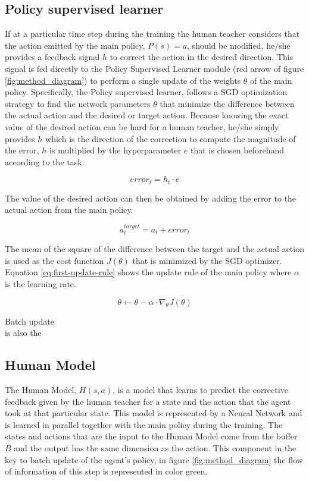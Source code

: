 \subsection*{Policy supervised learner}
If at a particular time step during the training the human teacher considers that the action emitted by the main policy, $P(s) = a$, should be modified, he/she provides a feedback signal $h$ to correct the action in the desired direction. This signal is fed directly to the Policy Supervised Learner module (red arrow of figure \ref{fig:method_diagram}) to perform a single update of the weights $\theta$ of the main policy. Specifically, the Policy supervised learner, follows a SGD optimization strategy to find the network parameters $\theta$ that minimize the difference between the actual action and the desired or target action. Because knowing the exact value of the desired action can be hard for a human teacher, he/she simply provides $h$ which is the direction of the correction to compute the magnitude of the error, $h$ is multiplied by the hyperparameter $e$ that is chosen beforehand according to the task.


\begin{equation}
{error}_t = h_t \cdot  e
\label{eq:error-D-COACH}
\end{equation}

The value of the desired action can then be obtained by adding the error to the actual action from the main policy.

\begin{equation}
a^{target}_t = a_t + {error}_t
\label{eq:a-target}
\end{equation}


The mean of the square of the difference between the target and the actual action is used as the cost function $J(\theta)$ that is minimized by the SGD optimizer. Equation \ref{eq:first-update-rule} shows the update rule of the main policy where $\alpha$ is the learning rate.


\begin{equation}
\theta \leftarrow \theta - \alpha \cdot \nabla_\theta J(\theta)
\label{eq:first-update-rule}
\end{equation}

Batch  update\\ is also the 




\subsection*{Human Model}
The Human Model,  $H(s, a)$, is a model that learns to predict the corrective feedback given by the human teacher for a state and the action that the agent took at that particular state. This model is represented by a Neural Network and is learned in parallel together with the main policy during the training. The states and actions that are the input to the Human Model come from the buffer $B$ and the output has the same dimension as the action.
This component in the key to batch update of the agent's policy, in figure \ref{fig:method_diagram} the flow of information of this step is represented in color green.


